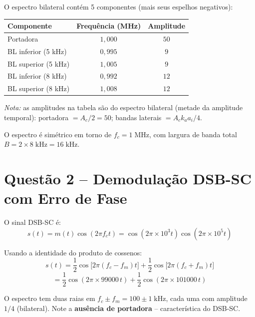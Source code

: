 \documentclass[11pt,a4paper]{article}
\begin{document}
\begin{resolucao}

O espectro bilateral contém 5 componentes (mais seus espelhos negativos):

\begin{center}
\small
\begin{tabular}{lcc}
  \toprule
  Componente & Frequência (MHz) & Amplitude \\
  \midrule
  Portadora & $1{,}000$ & $50$ \\
  BL inferior (5 kHz) & $0{,}995$ & $9$ \\
  BL superior (5 kHz) & $1{,}005$ & $9$ \\
  BL inferior (8 kHz) & $0{,}992$ & $12$ \\
  BL superior (8 kHz) & $1{,}008$ & $12$ \\
  \bottomrule
\end{tabular}
\end{center}

\textit{Nota:} as amplitudes na tabela são do espectro bilateral (metade da amplitude temporal): portadora $= A_c/2 = 50$; bandas laterais $= A_c k_a a_i / 4$.

O espectro é simétrico em torno de $f_c = 1\;\text{MHz}$, com largura de banda total $B = 2 \times 8\;\text{kHz} = 16\;\text{kHz}$.
\end{resolucao}


\section*{Questão 2 -- Demodulação DSB-SC com Erro de Fase}

\begin{resolucao}

O sinal DSB-SC é:
\[
  s(t) = m(t)\cos(2\pi f_c t) = \cos(2\pi \times 10^3 t)\cos(2\pi \times 10^5 t)
\]

Usando a identidade do produto de cossenos:
\[
  s(t) = \frac{1}{2}\cos\!\big[2\pi(f_c - f_m)t\big] + \frac{1}{2}\cos\!\big[2\pi(f_c + f_m)t\big]
\]
\[
  = \frac{1}{2}\cos(2\pi \times 99000\,t) + \frac{1}{2}\cos(2\pi \times 101000\,t)
\]

O espectro tem duas raias em $f_c \pm f_m = 100 \pm 1\;\text{kHz}$, cada uma com amplitude $1/4$ (bilateral). Note a \textbf{ausência de portadora} -- característica do DSB-SC.
\end{resolucao}
\end{document}
